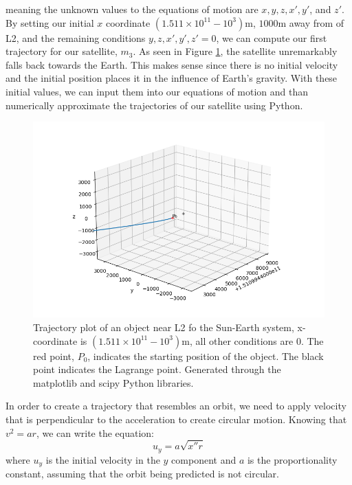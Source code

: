 meaning the unknown values to the equations of motion are $x, y, z, x', y'$, and $z'$.
By setting our initial $x$ coordinate $(1.511\times10^{11} - 10^3)\si{\metre}$, $1000\si{\metre}$ away from of L2, and the remaining conditions $y, z, x', y', z' = 0$, we can compute our first trajectory for our satellite, $m_3$.
As seen in Figure \ref{fig:3dplot1}, the satellite unremarkably falls back towards the Earth.
This makes sense since there is no initial velocity and the initial position places it in the influence of Earth's gravity.
With these initial values, we can input them into our equations of motion and than numerically approximate the trajectories of our satellite using Python.
\newpage
\begin{samepage}
\begin{figure}[ht!]
	\centering
	\includegraphics[scale=0.52]{3dplot1.png}
	\caption{Trajectory plot of an object near L2 fo the Sun-Earth system, x-coordinate is $(1.511\times10^{11} - 10^3)\si{\metre}$, all other conditions are 0.
		The red point, $P_0$, indicates the starting position of the object.
		The black point indicates the Lagrange point.
		Generated through the matplotlib and scipy Python libraries.
	}
	\label{fig:3dplot1}
\end{figure}
In order to create a trajectory that resembles an orbit, we need to apply velocity that is perpendicular to the acceleration to create circular motion.
Knowing that $v^2 = ar$, we can write the equation:
\begin{equation*}
	u_y = a\sqrt{x''r}
\end{equation*}
where $u_y$ is the initial velocity in the $y$ component and $a$ is the proportionality constant, assuming that the orbit being predicted is not circular.

\end{samepage}

